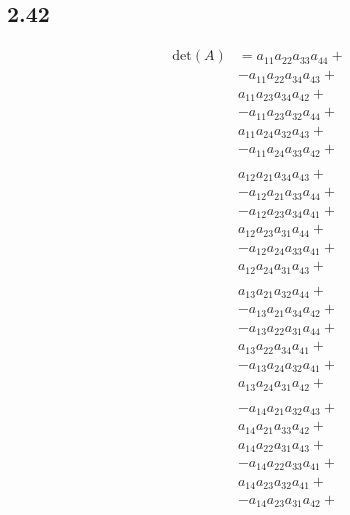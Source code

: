 \documentclass[letterpaper,12pt]{article}
\theoremstyle{definition}
\begin{document}
\subsection*{2.42}
\begin{align*}
    \text{det}(A) &= a_{11}a_{22}a_{33}a_{44} + \\
    & -a_{11}a_{22}a_{34}a_{43} + \\
    & a_{11}a_{23}a_{34}a_{42} + \\
    & -a_{11}a_{23}a_{32}a_{44} + \\
    & a_{11}a_{24}a_{32}a_{43} + \\
    & -a_{11}a_{24}a_{33}a_{42} + \\
    \\
    & a_{12}a_{21}a_{34}a_{43} + \\
    & -a_{12}a_{21}a_{33}a_{44} + \\
    & -a_{12}a_{23}a_{34}a_{41} + \\
    & a_{12}a_{23}a_{31}a_{44} + \\
    & -a_{12}a_{24}a_{33}a_{41} + \\
    & a_{12}a_{24}a_{31}a_{43} + \\
    \\
    & a_{13}a_{21}a_{32}a_{44} + \\
    & -a_{13}a_{21}a_{34}a_{42} + \\
    & -a_{13}a_{22}a_{31}a_{44} + \\
    & a_{13}a_{22}a_{34}a_{41} + \\
    & -a_{13}a_{24}a_{32}a_{41} + \\
    & a_{13}a_{24}a_{31}a_{42} + \\
    \\
    & -a_{14}a_{21}a_{32}a_{43} + \\
    & a_{14}a_{21}a_{33}a_{42} + \\
    & a_{14}a_{22}a_{31}a_{43} + \\
    & -a_{14}a_{22}a_{33}a_{41} + \\
    & a_{14}a_{23}a_{32}a_{41} + \\
    & -a_{14}a_{23}a_{31}a_{42} + \\
    \\
    \end{align*}
\end{document}

